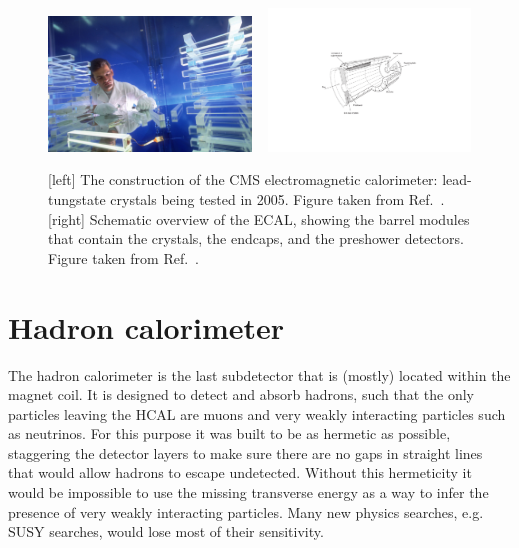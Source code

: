 \begin{figure}[htpb]
  \centering
  \includegraphics[width=0.48\textwidth]{figures/cms/cms_ecal_crystal}
~
  \includegraphics[width=0.48\textwidth]{figures/cms/CMS_ECAL}
  \caption{[left] The construction of the CMS electromagnetic calorimeter: lead-tungstate crystals
being tested in 2005. Figure taken from Ref.~\cite{CMS_ecal_crystal}.
[right] Schematic overview of the ECAL, showing the barrel modules that contain the crystals, the
endcaps, and the preshower detectors. Figure taken from Ref.~\cite{Chatrchyan:2008aa}.
  \label{fig:cms_ecal_crystal}}
\end{figure}

\section{Hadron calorimeter \label{sec:cms_hcal}}

The hadron calorimeter is the last subdetector that is (mostly) located within the magnet coil. It
is designed to detect and absorb hadrons, such that the only particles leaving the HCAL are muons
and very weakly interacting particles such as neutrinos.
For this purpose it was built to be as hermetic as possible, staggering the detector layers to
make sure there are no gaps in straight lines that would allow hadrons to escape undetected.
Without this hermeticity it would be impossible to use the missing transverse energy as a way to
infer the presence of very weakly interacting particles. Many new physics searches, e.g. SUSY
searches, would lose most of their sensitivity. 

